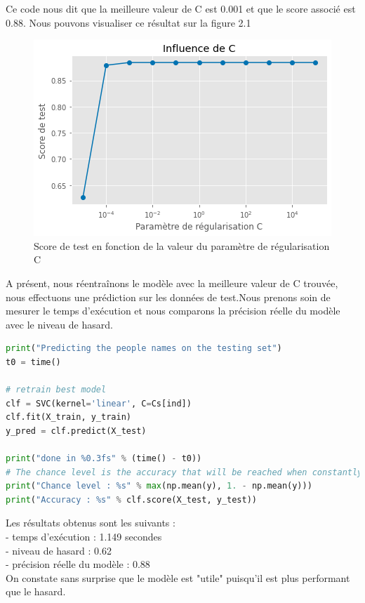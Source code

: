 \documentclass{book}
\begin{document}
Ce code nous dit que la meilleure valeur de C est 0.001 et que le score associé est 0.88. Nous pouvons visualiser ce résultat sur la figure 2.1

\begin{figure}[H] %
    \centering
    \includegraphics[width=1\textwidth]{figure 3.png}
    \caption{Score de test en fonction de la valeur du paramètre de régularisation C}
    \label{fig:exemple3}
\end{figure}

A présent, nous réentraînons le modèle avec la meilleure valeur de C trouvée, nous effectuons une prédiction sur les données de test.Nous prenons soin de mesurer le temps d'exécution et nous comparons la précision réelle du modèle avec le niveau de hasard.

\begin{lstlisting}[language=Python, caption=Utilisation de la meilleure valeur de C]
print("Predicting the people names on the testing set")
t0 = time()

# retrain best model
clf = SVC(kernel='linear', C=Cs[ind])
clf.fit(X_train, y_train)
y_pred = clf.predict(X_test)

print("done in %0.3fs" % (time() - t0))
# The chance level is the accuracy that will be reached when constantly predicting the majority class.
print("Chance level : %s" % max(np.mean(y), 1. - np.mean(y)))
print("Accuracy : %s" % clf.score(X_test, y_test))
\end{lstlisting}

Les résultats obtenus sont les suivants :\\
- temps d'exécution : 1.149 secondes\\
- niveau de hasard : 0.62\\
- précision réelle du modèle : 0.88\\
On constate sans surprise que le modèle est "utile" puisqu'il est plus performant que le hasard.
\end{document}
